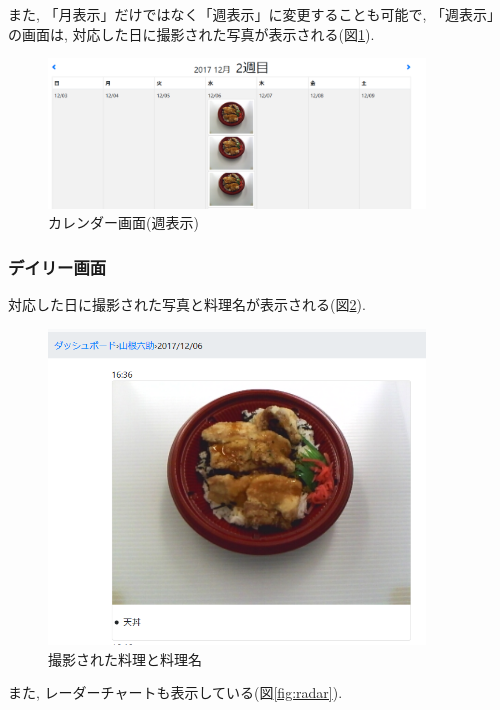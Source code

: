 \documentclass[../report]{subfiles}
\begin{document}
また, 「月表示」だけではなく「週表示」に変更することも可能で, 「週表示」の画面は, 対応した日に撮影された写真が表示される(図\ref{fig:calendar-week}).

\begin{figure}[htbp]
    \begin{center}
        \includegraphics[width=10cm]{imgs/5_week.png}
        \caption{カレンダー画面(週表示)}
        \label{fig:calendar-week}
    \end{center}
\end{figure}

\subsubsection{デイリー画面}
対応した日に撮影された写真と料理名が表示される(図\ref{fig:meal}).

\begin{figure}[htbp]
    \begin{center}
        \includegraphics[width=10cm]{imgs/5_day1.png}
        \caption{撮影された料理と料理名}
        \label{fig:meal}
    \end{center}
\end{figure}

また, レーダーチャートも表示している(図\ref{fig:radar}).
\end{document}
